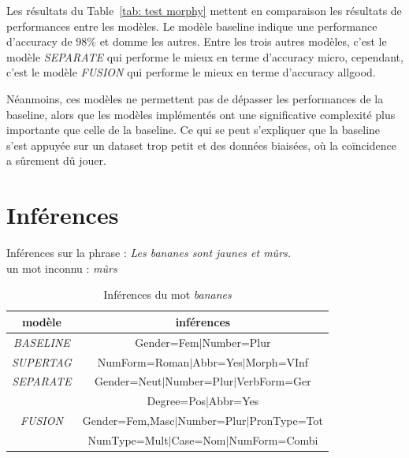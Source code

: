 \documentclass[a4paper]{article}
\begin{document}
Les résultats du Table~\ref{tab: test morphy} mettent en comparaison les résultats de performances entre les modèles.
Le modèle baseline indique une performance d'accuracy de 98\% et domme les autres.
Entre les trois autres modèles, c'est le modèle \textit{SEPARATE} qui performe le mieux en terme d'accuracy micro, cependant,
c'est le modèle \textit{FUSION} qui performe le mieux en terme d'accuracy allgood. 

Néanmoins, ces modèles ne permettent pas de dépasser les performances de la baseline, alors que les modèles implémentés ont une
significative complexité plus importante que celle de la baseline.
Ce qui se peut s'expliquer que la baseline s'est appuyée sur
un dataset trop petit et des données biaisées, où la coïncidence a sûrement dû jouer. 

\section{Inférences}

Inférences sur la phrase : \textit{Les bananes sont jaunes et mûrs.} \\
un mot inconnu : \textit{mûrs}
\begin{table}[H]
    \centering
    \begin{tabular}{|c|c|}
        \hline
        \textbf{modèle} & \textbf{inférences} \\
        \hline
        \textit{BASELINE} & Gender=Fem$\mid$Number=Plur \\
        \hline
        \textit{SUPERTAG} & NumForm=Roman$\mid$Abbr=Yes$\mid$Morph=VInf\\
        \hline
        \textit{SEPARATE} & Gender=Neut$\mid$Number=Plur$\mid$VerbForm=Ger\\
            & Degree=Pos$\mid$Abbr=Yes\\
        \hline
        \textit{FUSION} & Gender=Fem,Masc$\mid$Number=Plur$\mid$PronType=Tot\\
            & NumType=Mult$\mid$Case=Nom$\mid$NumForm=Combi\\
        \hline
    \end{tabular}
    \caption{Inférences du mot \textit{bananes}}
\end{table}
\end{document}

